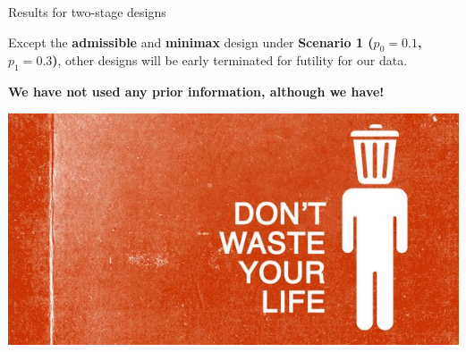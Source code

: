 \begin{frame}{Results for two-stage designs}

Except the \textbf{admissible} and \textbf{minimax} design under
\textbf{Scenario 1 (\(p_0=0.1\), \(p_1=0.3\))}, other designs will be
early terminated for futility for our data.

\textbf{We have not used any prior information, although we have!}

\includegraphics{dwyl.jpg}

\end{frame}

